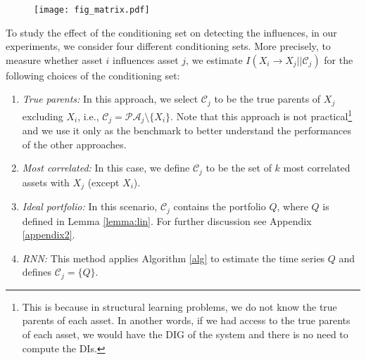 \begin{figure}
    \centering
    \texttt{[image: fig\_matrix.pdf]}
    \label{fig:matrix}
\end{figure}

To study the effect of the conditioning set on detecting the influences, in our experiments, we consider four different conditioning sets.
More precisely, to measure whether asset $i$ influences asset $j$, we estimate $I(X_i\rightarrow X_j||\mathcal{C}_j)$ for the following choices of the conditioning set:

\clearpage 

\begin{enumerate}
    \item \textit{True parents:} In this approach, we select $\mathcal{C}_j$ to be the true parents of $X_j$ excluding $X_i$, i.e., $\mathcal{C}_j=\mathcal{PA}_{j}\setminus\{X_i\}$.
    Note that this approach is not practical\footnote{This is because in structural learning problems, we do not know the true parents of each asset. In another words, if we had access to the true parents of each asset, we would have the DIG of the system and there is no need to compute the DIs.} and we use it only as the benchmark to better understand the performances of the other approaches. 
    
    \item \textit{Most correlated:} In this case, we define $\mathcal{C}_j$ to be the set of $k$ most correlated assets with $X_j$ (except $X_i$).
    
    \item \textit{Ideal portfolio:} In this scenario, $\mathcal{C}_j$ contains the portfolio $Q$, where $Q$ is defined in Lemma \ref{lemma:lin}.
    For further discussion see Appendix \ref{appendix2}. 
    
    \item \textit{RNN:} This method applies Algorithm \ref{alg} to estimate the time series $Q$ and defines $\mathcal{C}_j=\{Q\}$.
    
\end{enumerate}
